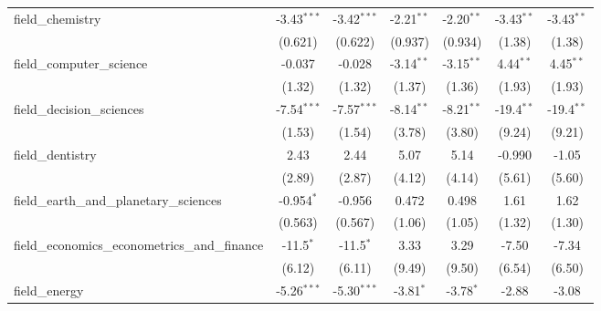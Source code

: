 \begin{tabular}{lcccccc}
   field\_chemistry                                            & -3.43$^{***}$  & -3.42$^{***}$  & -2.21$^{**}$   & -2.20$^{**}$   & -3.43$^{**}$   & -3.43$^{**}$\\   
                                                               & (0.621)        & (0.622)        & (0.937)        & (0.934)        & (1.38)         & (1.38)\\   
   field\_computer\_science                                    & -0.037         & -0.028         & -3.14$^{**}$   & -3.15$^{**}$   & 4.44$^{**}$    & 4.45$^{**}$\\   
                                                               & (1.32)         & (1.32)         & (1.37)         & (1.36)         & (1.93)         & (1.93)\\   
   field\_decision\_sciences                                   & -7.54$^{***}$  & -7.57$^{***}$  & -8.14$^{**}$   & -8.21$^{**}$   & -19.4$^{**}$   & -19.4$^{**}$\\   
                                                               & (1.53)         & (1.54)         & (3.78)         & (3.80)         & (9.24)         & (9.21)\\   
   field\_dentistry                                            & 2.43           & 2.44           & 5.07           & 5.14           & -0.990         & -1.05\\   
                                                               & (2.89)         & (2.87)         & (4.12)         & (4.14)         & (5.61)         & (5.60)\\   
   field\_earth\_and\_planetary\_sciences                      & -0.954$^{*}$   & -0.956         & 0.472          & 0.498          & 1.61           & 1.62\\   
                                                               & (0.563)        & (0.567)        & (1.06)         & (1.05)         & (1.32)         & (1.30)\\   
   field\_economics\_econometrics\_and\_finance                & -11.5$^{*}$    & -11.5$^{*}$    & 3.33           & 3.29           & -7.50          & -7.34\\   
                                                               & (6.12)         & (6.11)         & (9.49)         & (9.50)         & (6.54)         & (6.50)\\   
   field\_energy                                               & -5.26$^{***}$  & -5.30$^{***}$  & -3.81$^{*}$    & -3.78$^{*}$    & -2.88          & -3.08\\   

\end{tabular}
